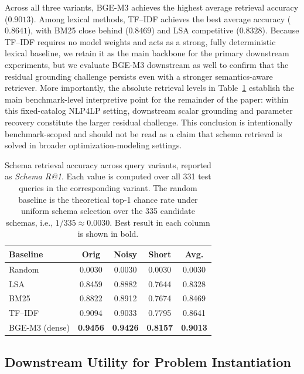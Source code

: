 \documentclass[pdflatex,sn-basic,Numbered]{sn-jnl}
\begin{document}
Across all three variants, BGE-M3 achieves the highest average retrieval accuracy ($0.9013$). Among lexical methods, TF--IDF achieves the best average accuracy ($0.8641$), with BM25 close behind ($0.8469$) and LSA competitive ($0.8328$). Because TF--IDF requires no model weights and acts as a strong, fully deterministic lexical baseline, we retain it as the main backbone for the primary downstream experiments, but we evaluate BGE-M3 downstream as well to confirm that the residual grounding challenge persists even with a stronger semantics-aware retriever. More importantly, the absolute retrieval levels in Table~\ref{tab:nlp4lp-retrieval-main} establish the main benchmark-level interpretive point for the remainder of the paper: within this fixed-catalog \textsc{NLP4LP} setting, downstream scalar grounding and parameter recovery constitute the larger residual challenge. This conclusion is intentionally benchmark-scoped and should not be read as a claim that schema retrieval is solved in broader optimization-modeling settings.

\begin{table}[t]
  \centering
  \caption{Schema retrieval accuracy across query variants, reported as \textit{Schema R@1}. Each value is computed over all 331 test queries in the corresponding variant. The random baseline is the theoretical top-1 chance rate under uniform schema selection over the 335 candidate schemas, i.e., $1/335 \approx 0.0030$. Best result in each column is shown in bold.}
  \label{tab:nlp4lp-retrieval-main}
  \small
  \begin{tabular}{lcccc}
    \toprule
    Baseline & Orig & Noisy & Short & Avg. \\
    \midrule
    Random  & 0.0030 & 0.0030 & 0.0030 & 0.0030 \\
    LSA     & 0.8459 & 0.8882 & 0.7644 & 0.8328 \\
    BM25    & 0.8822 & 0.8912 & 0.7674 & 0.8469 \\
    TF--IDF & 0.9094 & 0.9033 & 0.7795 & 0.8641 \\
    BGE-M3 (dense) & \textbf{0.9456} & \textbf{0.9426} & \textbf{0.8157} & \textbf{0.9013} \\
    \bottomrule
  \end{tabular}
\end{table}

\subsection{Downstream Utility for Problem Instantiation}
\label{subsec:exp_downstream}
\end{document}
